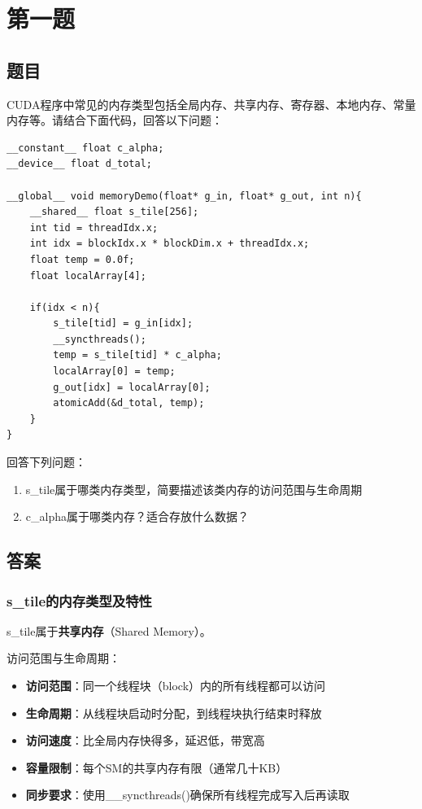 \chapter{第一题}

\section{题目}

CUDA程序中常见的内存类型包括全局内存、共享内存、寄存器、本地内存、常量内存等。请结合下面代码，回答以下问题：

\begin{lstlisting}[style=cleancpp]
__constant__ float c_alpha;
__device__ float d_total;

__global__ void memoryDemo(float* g_in, float* g_out, int n){
    __shared__ float s_tile[256];
    int tid = threadIdx.x;
    int idx = blockIdx.x * blockDim.x + threadIdx.x;
    float temp = 0.0f;
    float localArray[4];
    
    if(idx < n){
        s_tile[tid] = g_in[idx];
        __syncthreads();
        temp = s_tile[tid] * c_alpha;
        localArray[0] = temp;
        g_out[idx] = localArray[0];
        atomicAdd(&d_total, temp);
    }
}
\end{lstlisting}

回答下列问题：
\begin{enumerate}
    \item s\_tile属于哪类内存类型，简要描述该类内存的访问范围与生命周期
    \item c\_alpha属于哪类内存？适合存放什么数据？
\end{enumerate}

\section{答案}
\subsection{s\_tile的内存类型及特性}

s\_tile属于\textbf{共享内存}（Shared Memory）。

访问范围与生命周期：
\begin{itemize}
    \item \textbf{访问范围}：同一个线程块（block）内的所有线程都可以访问
    \item \textbf{生命周期}：从线程块启动时分配，到线程块执行结束时释放
    \item \textbf{访问速度}：比全局内存快得多，延迟低，带宽高
    \item \textbf{容量限制}：每个SM的共享内存有限（通常几十KB）
    \item \textbf{同步要求}：使用\_\_syncthreads()确保所有线程完成写入后再读取
\end{itemize}

